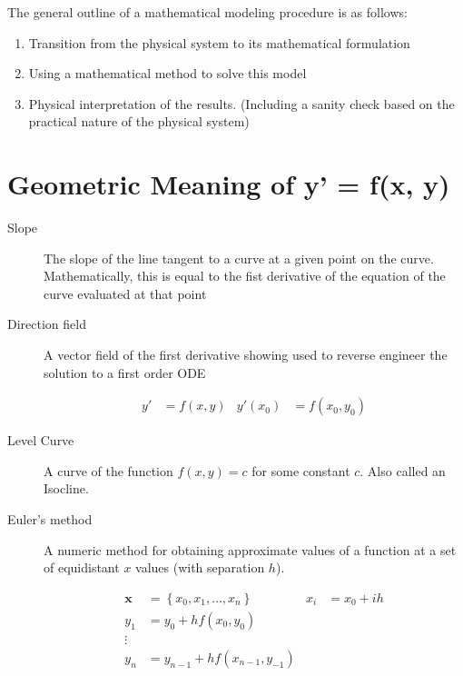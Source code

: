 The general outline of a mathematical modeling procedure is as follows:

\begin{enumerate}
    \item Transition from the physical system to its mathematical formulation
    \item Using a mathematical method to solve this model
    \item Physical interpretation of the results. (Including a sanity check based on the practical nature of the physical system)
\end{enumerate}

\section{Geometric Meaning of y' = f(x, y)}

\begin{description}
    \item[Slope] The slope of the line tangent to a curve at a given point on the curve. Mathematically, this is equal to the fist derivative of the equation of the curve evaluated at that point
    \item[Direction field] A vector field of the first derivative showing used to reverse engineer the solution to a first order ODE

        \begin{align}
            y' & = f(x, y) & y'(x_{0}) & = f(x_{0}, y_{0})
        \end{align}

    \item[Level Curve] A curve of the function $f(x, y) = c$ for some constant $c$. Also called an Isocline.
    \item[Euler's method] A numeric method for obtaining approximate values of a function at a set of equidistant $x$ values (with separation $h$).

        \begin{align}
            \mathbf{x} & = \left\{x_{0}, x_{1}, \dots, x_{n}\right\} & x_{i} & = x_{0} + ih \\
            y_{1}      & = y_{0} + h f(x_{0}, y_{0})                                        \\
            \vdots \nonumber                                                                \\
            y_{n}      & = y_{n-1} + h f(x_{n-1}, y_{-1})
        \end{align}
\end{description}

